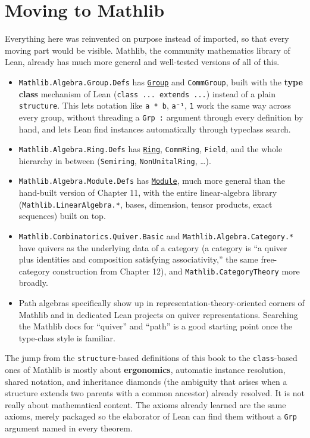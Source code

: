 \section{Moving to Mathlib}\label{sec:14-next-steps:02-moving-to-mathlib:1}

Everything here was reinvented on purpose instead of imported, so that every moving part would be visible. Mathlib, the community mathematics library of Lean, already has much more general and well-tested versions of all of this.

\begin{itemize}
\tightlist
\item
  \texttt{Mathlib.Algebra.Group.Defs} has \href{https://loogle.lean-lang.org/?q=Group}{\texttt{Group}} and \texttt{CommGroup}, built with the \textbf{type class} mechanism of Lean (\texttt{class ... extends ...}) instead of a plain \texttt{structure}. This lets notation like \texttt{a * b}, \texttt{a⁻¹}, \texttt{1} work the same way across every group, without threading a \texttt{Grp :} argument through every definition by hand, and lets Lean find instances automatically through typeclass search.
\item
  \texttt{Mathlib.Algebra.Ring.Defs} has \href{https://loogle.lean-lang.org/?q=Ring}{\texttt{Ring}}, \texttt{CommRing}, \texttt{Field}, and the whole hierarchy in between (\texttt{Semiring}, \texttt{NonUnitalRing}, \ldots).
\item
  \texttt{Mathlib.Algebra.Module.Defs} has \href{https://loogle.lean-lang.org/?q=Module}{\texttt{Module}}, much more general than the hand-built version of Chapter 11, with the entire linear-algebra library (\texttt{Mathlib.LinearAlgebra.*}, bases, dimension, tensor products, exact sequences) built on top.
\item
  \texttt{Mathlib.Combinatorics.Quiver.Basic} and \texttt{Mathlib.Algebra.Category.*} have quivers as the underlying data of a category (a category is ``a quiver plus identities and composition satisfying associativity,'' the same free-category construction from Chapter 12), and \texttt{Mathlib.CategoryTheory} more broadly.
\item
  Path algebras specifically show up in representation-theory-oriented corners of Mathlib and in dedicated Lean projects on quiver representations. Searching the Mathlib docs for ``quiver'' and ``path'' is a good starting point once the type-class style is familiar.
\end{itemize}

The jump from the \texttt{structure}-based definitions of this book to the \texttt{class}-based ones of Mathlib is mostly about \textbf{ergonomics}, automatic instance resolution, shared notation, and inheritance diamonds (the ambiguity that arises when a structure extends two parents with a common ancestor) already resolved. It is not really about mathematical content. The axioms already learned are the same axioms, merely packaged so the elaborator of Lean can find them without a \texttt{Grp} argument named in every theorem.

